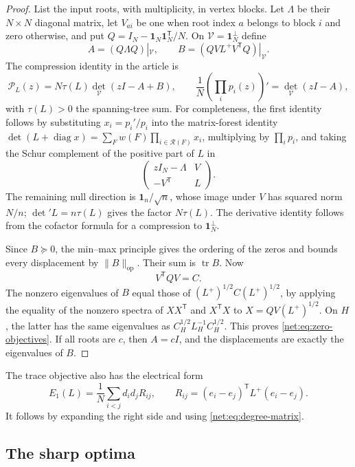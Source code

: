 \begin{proof}
List the input roots, with multiplicity, in vertex blocks. Let
$\Lambda$ be their $N\times N$ diagonal matrix, let $V_{ai}$ be one when
root index $a$ belongs to block $i$ and zero otherwise, and put
$Q=I_N-\mathbf1_N\mathbf1_N^{\mathsf T}/N$.
On $\mathcal V=\mathbf1_N^\perp$ define
\[
 A=(Q\Lambda Q)|_{\mathcal V},\qquad
 B=(QVL^+V^{\mathsf T}Q)|_{\mathcal V}.
\]
The compression identity in the article is
\[
 \mathcal P_L(z)=N\tau(L)\det_{\mathcal V}(zI-A+B),\qquad
 \frac1N\left(\prod_i p_i(z)\right)'
       =\det_{\mathcal V}(zI-A),
\]
with $\tau(L)>0$ the spanning-tree sum. For completeness, the first
identity follows by substituting $x_i=p_i'/p_i$ into the matrix-forest
identity $\det(L+\operatorname{diag}x)=\sum_F w(F)\prod_{i\in
\mathcal R(F)}x_i$, multiplying by $\prod_i p_i$, and taking the Schur
complement of the positive part of $L$ in
\[
 \begin{pmatrix}zI_N-\Lambda&V\\-V^{\mathsf T}&L\end{pmatrix}.
\]
The remaining null direction is $\mathbf1_n/\sqrt n$, whose image under
$V$ has squared norm $N/n$; $\det{}'L=n\tau(L)$ gives the factor
$N\tau(L)$. The derivative identity follows from the cofactor formula for
a compression to $\mathbf1_N^\perp$.

Since $B\succeq0$, the min--max principle gives the ordering of the zeros
and bounds every displacement by $\|B\|_{\mathrm{op}}$. Their sum is
$\operatorname{tr}B$. Now
\[
 V^{\mathsf T}QV=C.
\]
The nonzero eigenvalues of $B$ equal those of
$(L^+)^{1/2}C(L^+)^{1/2}$, by applying the equality of the nonzero spectra
of $XX^{\mathsf T}$ and $X^{\mathsf T}X$ to
$X=QV(L^+)^{1/2}$. On $H$, the latter has the same eigenvalues as
$C_H^{1/2}L_H^{-1}C_H^{1/2}$. This proves
\eqref{net:eq:zero-objectives}. If all roots are $c$, then $A=cI$, and
the displacements are exactly the eigenvalues of $B$.
\end{proof}

The trace objective also has the electrical form
\begin{equation}\label{net:eq:resistances}
 E_1(L)=\frac1N\sum_{i<j}d_i d_jR_{ij},\qquad
 R_{ij}=(e_i-e_j)^{\mathsf T}L^+(e_i-e_j).
\end{equation}
It follows by expanding the right side and using \eqref{net:eq:degree-matrix}.

\subsection{The sharp optima}

